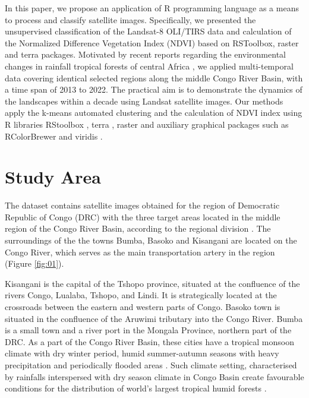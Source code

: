 \documentclass[applsci,article,submit,pdftex,moreauthors]{Definitions/mdpi}
\begin{document}
In this paper, we propose an application of R programming language \cite{RCoreTeam} as a means to process and classify satellite images. Specifically, we presented the unsupervised classification of the Landsat-8 OLI/TIRS data and calculation of the Normalized Difference Vegetation Index (NDVI) based on RSToolbox, raster and terra packages. Motivated by recent reports regarding the environmental changes in rainfall tropical forests of central Africa \cite{Wasseige,lescuyer2010chainsaw,Jayathilake,POTAPOV2012106,Shapiro,7326202}, we applied multi-temporal data covering identical selected regions along the middle Congo River Basin, with a time span of 2013 to 2022. The practical aim is to demonstrate the dynamics of the landscapes within a decade using Landsat satellite images. Our methods apply the k-means automated clustering and the calculation of NDVI index using R libraries RStoolbox \cite{RStoolbox}, terra \cite{RTerra}, raster \cite{Hijmans} and auxiliary graphical packages such as RColorBrewer \cite{Neuwirth} and viridis \cite{viridis}. 

\section{Study Area}

The dataset contains satellite images obtained for the region of Democratic Republic of Congo (DRC) with the three target areas located in the middle region of the Congo River Basin, according to the regional division \cite{MUSHI201964}. The surroundings of the the towns Bumba, Basoko and Kisangani are located on the Congo River, which serves as the main transportation artery in the region (Figure \ref{fig:01}). 

Kisangani is the capital of the Tshopo province, situated at the confluence of the rivers Congo, Lualaba, Tshopo, and Lindi. It is strategically located at the crossroads between the eastern and western parts of Congo. Basoko town is situated in the confluence of the Aruwimi tributary into the Congo River. Bumba is a small town and a river port in the Mongala Province, northern part of the DRC. As a part of the Congo River Basin, these cities have a tropical monsoon climate with dry winter period, humid summer-autumn seasons with heavy precipitation and periodically flooded areas \cite{6571272}. Such climate setting, characterised by rainfalls interspersed with dry season climate in Congo Basin create favourable conditions for the distribution of world's largest tropical humid forests \cite{Washington}. 
\end{document}
